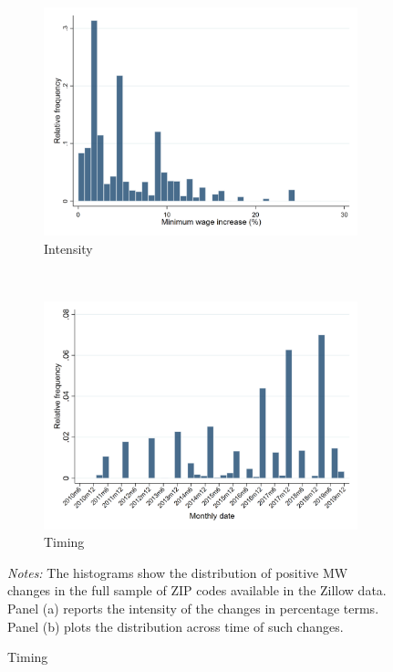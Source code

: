 \begin{figure}[h!]
    \centering
    \caption{Distribution of Minimum Wage Changes}
    \label{fig:distrib_mw_changes}
    \begin{subfigure}{.7\textwidth}
        \caption{Intensity}
        \includegraphics[width = \textwidth]
            {descriptive/estimation_samples/output/pct_ch_mw_dist}
    \end{subfigure}\\
    \begin{subfigure}{.7\textwidth}
        \caption{Timing}
        \includegraphics[width = \textwidth]
            {descriptive/estimation_samples/output/pct_ch_mw_date_dist}
    \end{subfigure}

    \begin{minipage}{.95\textwidth} \footnotesize
        \vspace{3mm}
        \textit{Notes:} The histograms show the distribution of positive MW changes 
        in the full sample of ZIP codes available in the Zillow data. Panel (a) reports 
        the intensity of the changes in percentage terms. Panel (b) plots the distribution 
        across time of such changes. 
    \end{minipage}
\end{figure}
